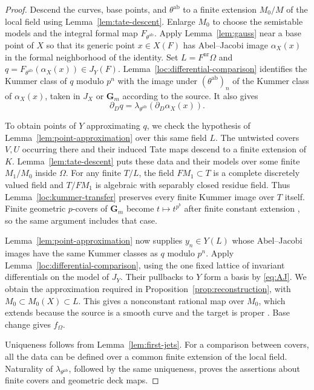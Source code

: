 \documentclass[11pt,a4paper]{article}
\numberwithin{equation}{section}
\theoremstyle{plain}
\theoremstyle{definition}
\theoremstyle{remark}
\newcommand{\Gm}{\mathbf G_m}
\newcommand{\ab}{\mathrm{ab}}
\newcommand{\nr}{\mathrm{nr}}
\newcommand{\stacks}[1]{\href{https://stacks.math.columbia.edu/tag/#1}{\texttt{#1}}}
\begin{document}
\begin{proof}
Descend the curves, base points, and $\theta^{\ab}$ to a finite extension $M_0/M$
of the local field using Lemma~\ref{lem:tate-descent}. Enlarge $M_0$ to choose the
semistable models and the integral formal map $F_{\theta^{\ab}}$. Apply
Lemma~\ref{lem:gauss} near a base point of $X$ so that its generic point
$x\in X(F)$ has Abel--Jacobi image $\alpha_X(x)$ in the formal
neighborhood of the identity. Set
$L=F^{\nr}\Omega$ and
$q=F_{\theta^{\ab}}(\alpha_X(x))\in J_Y(F)$.
Lemma~\ref{loc:differential-comparison} identifies the Kummer class of
$q$ modulo $p^n$ with the image under $(\theta^{\ab})_n$ of the Kummer
class of $\alpha_X(x)$, taken in $J_X$ or $\Gm$ according to the
source. It also gives
\[
 \partial_Dq=\lambda_{\theta^{\ab}}(\partial_D\alpha_X(x)).
\]

To obtain points of $Y$ approximating $q$, we check the hypothesis of
Lemma~\ref{lem:point-approximation} over this same field $L$.
The untwisted covers $V,U$ occurring there and their induced Tate maps
descend to a finite extension of $K$.
Lemma~\ref{lem:tate-descent} puts these data and their models over some
finite $M_1/M_0$ inside $\Omega$. For any finite $T/L$,
the field $FM_1\subset T$ is a complete discretely valued field and
$T/FM_1$ is algebraic with separably closed residue field. Thus
Lemma~\ref{loc:kummer-transfer} preserves every finite Kummer image over
$T$ itself. Finite geometric $p$-covers of $\Gm$ become
$t\mapsto t^{p^b}$ after finite constant extension
\cite[Example~9.8]{Milne1986}, so the same argument includes that case.

Lemma~\ref{lem:point-approximation} now supplies $y_n\in Y(L)$ whose
Abel--Jacobi images have the same Kummer classes as $q$ modulo $p^n$.
Apply Lemma~\ref{loc:differential-comparison}, using the one fixed lattice
of invariant differentials on the model of $J_Y$. Their pullbacks to $Y$
form a basis by \eqref{eq:AJ}. We obtain the approximation required in
Proposition~\ref{prop:reconstruction}, with
$M_0\subset M_0(X)\subset L$. This gives a nonconstant rational map over
$M_0$, which extends because the source is a smooth curve and the target
is proper \cite[Tag~\stacks{0BXZ}]{Stacks}. Base change gives $f_\Omega$.

Uniqueness follows from Lemma~\ref{lem:first-jets}. For a comparison
between covers, all the data can be defined over a common finite
extension of the local field. Naturality of
$\lambda_{\theta^{\ab}}$, followed by the same uniqueness, proves the assertions
about finite covers and geometric deck maps.
\end{proof}
\end{document}
